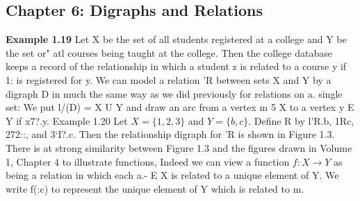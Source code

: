 \documentclass[]{article}
\begin{document}
\subsection*{Chapter 6: Digraphs and Relations}
\textbf{Example 1.19} Let X be the set of all students registered at a college and Y be
the set or" atl courses being taught at the college. Then the college database keeps
a record of the relationship in which a student z is related to a course y if 1: is
registered for y.
We can model a relation 'R between sets X and Y by a digraph D in much the
same way as we did previously for relations on a. single set: We put l/(D) = X U Y
and draw an arc from a vertex m 5 X to a vertex y E Y if x7?.y.
Example 1.20 Let $X = \{1, 2,3\}$ and $Y = \{b, c\}$. Define R by l’R.b, 1Rc, 272::, and
3‘I?.c. Then the relationship digraph for 'R is shown in Figure 1.3.
There is at strong similarity between Figure 1.3 and the figures drawn in Volume
1, Chapter 4 to illustrate functions, Indeed we can view a function $f : X \rightarrow Y$ as
being a relation in which each a.- E X is related to a unique element of Y. We write
f(:c) to represent the unique element of Y which is related to m.
\end{document}
